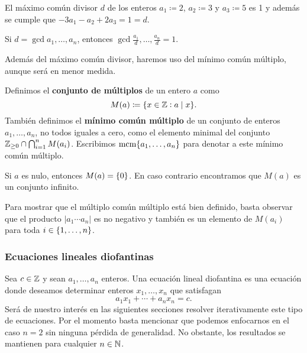 \begin{example}
	El máximo común divisor $d$ de los enteros $a_1 \coloneq 2$, $a_2 \coloneq 3$ y $a_3 \coloneq 5$
	es 1 y además se cumple que $-3a_1 - a_2 + 2a_3 = 1 = d$.
\end{example}

\begin{lemma}
	\label{prerreq:lemma:gcd}
	Si $d = \gcd{a_1, \ldots, a_n}$, entonces $\gcd{\frac{a_1}{d}, \ldots, \frac{a_n}{d}} = 1$.
\end{lemma}

Además del máximo común divisor, haremos uso del mínimo común múltiplo, aunque será en menor medida.
\begin{definition}
	Definimos el \textbf{conjunto de múltiplos} de un entero $a$ como
	\begin{equation*}
		M(a) \coloneq \lbrace x \in \mathbb{Z} \vcentcolon a \mid x \rbrace.
	\end{equation*}
	También definimos el \textbf{mínimo común múltiplo} de un conjunto de enteros $a_1, \ldots,
	a_n$, no todos iguales a cero, como el elemento minimal del conjunto $\mathbb{Z}_{\geq 0} \cap
	\bigcap_{i=1}^{n}M(a_i)$. Escribimos $\mathop{\mathrm{mcm}{\left\lbrace a_1, \ldots, a_n \right\rbrace}}$ para denotar a este mínimo común
	múltiplo.
\end{definition}

\begin{observation}
	Si $a$ es nulo, entonces $M(a) = \lbrace 0 \rbrace$. En caso contrario encontramos que $M(a)$ es un
	conjunto infinito.
\end{observation}

Para mostrar que el múltiplo común múltiplo está bien definido, basta observar que el producto $|a_1
\cdots a_n|$ es no negativo y también es un elemento de $M(a_i)$ para toda $i \in \lbrace 1, \ldots,
n \rbrace$.

\subsubsection{Ecuaciones lineales diofantinas}

\noindent
Sea $c \in \mathbb{Z}$ y sean $a_1, \ldots, a_n$ enteros. Una ecuación lineal diofantina es una ecuación
donde deseamos determinar enteros $x_1, \ldots, x_n$ que satisfagan
\begin{equation*}
	a_1x_1 + \cdots + a_nx_n = c.
\end{equation*}
Será de nuestro interés en las siguientes secciones resolver iterativamente este tipo de ecuaciones.
Por el momento basta mencionar que podemos enfocarnos en el caso $n = 2$ sin ninguna pérdida de
generalidad. No obstante, los resultados se mantienen para cualquier $n \in \mathbb{N}$.

